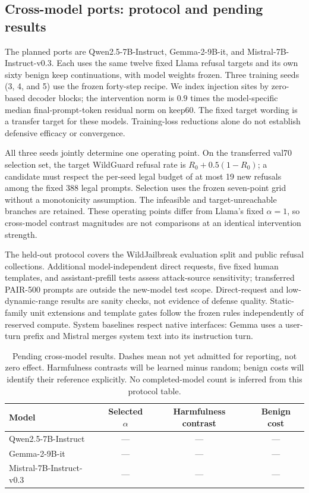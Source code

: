 \subsection{Cross-model ports: protocol and pending results}
\label{sec:crossmodel-pending}
The planned ports are Qwen2.5-7B-Instruct, Gemma-2-9B-it, and Mistral-7B-Instruct-v0.3. Each uses the same twelve fixed Llama refusal targets and its own sixty benign keep continuations, with model weights frozen. Three training seeds (3, 4, and 5) use the frozen forty-step recipe. We index injection sites by zero-based decoder blocks; the intervention norm is $0.9$ times the model-specific median final-prompt-token residual norm on keep60. The fixed target wording is a transfer target for these models. Training-loss reductions alone do not establish defensive efficacy or convergence.

All three seeds jointly determine one operating point. On the transferred val70 selection set, the target WildGuard refusal rate is $R_0+0.5(1-R_0)$; a candidate must respect the per-seed legal budget of at most 19 new refusals among the fixed 388 legal prompts. Selection uses the frozen seven-point grid without a monotonicity assumption. The infeasible and target-unreachable branches are retained. These operating points differ from Llama's fixed $\alpha=1$, so cross-model contrast magnitudes are not comparisons at an identical intervention strength.

The held-out protocol covers the WildJailbreak evaluation split and public refusal collections. Additional model-independent direct requests, five fixed human templates, and assistant-prefill tests assess attack-source sensitivity; transferred PAIR-500 prompts are outside the new-model test scope. Direct-request and low-dynamic-range results are sanity checks, not evidence of defense quality. Static-family unit extensions and template gates follow the frozen rules independently of reserved compute. System baselines respect native interfaces: Gemma uses a user-turn prefix and Mistral merges system text into its instruction turn.

\begin{table}[t]
\centering
\small
\begin{tabular}{lccc}
\toprule
Model & Selected $\alpha$ & Harmfulness contrast & Benign cost \\
\midrule
Qwen2.5-7B-Instruct & --- & --- & --- \\
Gemma-2-9B-it & --- & --- & --- \\
Mistral-7B-Instruct-v0.3 & --- & --- & --- \\
\bottomrule
\end{tabular}
\caption{Pending cross-model results. Dashes mean not yet admitted for reporting, not zero effect. Harmfulness contrasts will be learned minus random; benign costs will identify their reference explicitly. No completed-model count is inferred from this protocol table.}
\label{tab:crossmodel-pending}
\end{table}
